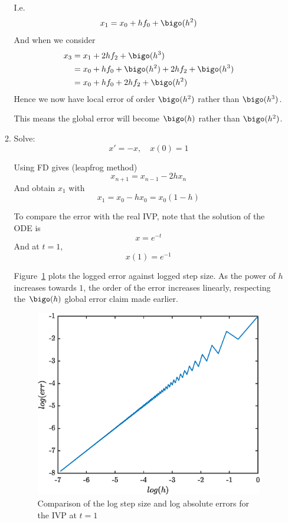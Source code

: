 \documentclass{X:/Documents/Coding/Latex/myassignment}
\begin{document}
\begin{enumerate}
\begin{enumerate}
		I.e. 
		\[x_{1} = x_0 + hf_0 + \bigo(h^2) \]
		And when we consider 
		\begin{align*}
		x_{3} &= x_{1} + 2h f_2 + \bigo(h^3) \\
		&=x_0 + hf_0 + \bigo(h^2) + 2hf_2 +\bigo(h^3) \\
		&=	x_0 + hf_0 + 2hf_2 +\bigo(h^2) 
		\end{align*}
		Hence we now have local error of order $\bigo(h^2)$ rather than $\bigo(h^3)$.

		This means the global error will become $\bigo(h)$ rather than $\bigo(h^2)$.



		\item %
		Solve:
		\[x' = -x, \quad x(0)=1\]

		Using FD gives (leapfrog method)
		\[x_{n+1} = x_{n-1} - 2h x_n\]
		And obtain $x_1$ with
		\[x_1 = x_0 - hx_0 = x_0(1-h)\]


		To compare the error with the real IVP, note that the solution of the ODE is
		\[x = e^{-t}\]
		And at $t =1$,
		\[x(1) = e^{-1}\]

		Figure~\ref{fig:err} plots the logged error against logged step size. As the power of $h$ increases towards $1$, the order of the error increases linearly, respecting the $\bigo(h)$ global error claim made earlier.



			\begin{figure}[h]
				\centering
				\includegraphics[width=\linewidth]{ODEsA4Q3b.eps}
				\caption{Comparison of the log step size and log absolute errors for the IVP at $t=1$}
				\label{fig:err}
			\end{figure}


\end{enumerate}
\end{enumerate}
\end{document}
